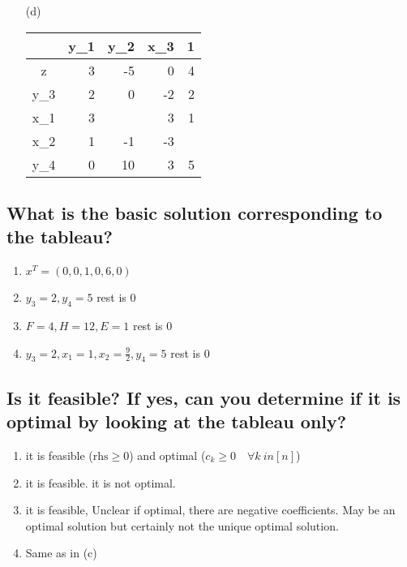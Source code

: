\documentclass[12pt, a4]{article}
\begin{document}
\begin{minipage}[h]{.5\textwidth}
	\begin{enumerate}
		\item[(d)] {\begin{tabular}{C|RRR|R}
				& y_1 & y_2 & x_3 & 1 \\
				\hline
				z& 3 & -5 & 0 & 4 \\
				\hline
				y_3 & 2 & 0 & -2 & 2 \\
				x_1 & 3 &  & 3 & 1 \\
				x_2 & 1 & -1 & -3 &  \\
				y_4 & 0 & 10 & 3 & 5
		\end{tabular}}
	\end{enumerate}
\end{minipage}

\subsection{What is the basic solution corresponding to the tableau?}
\begin{enumerate}[label=(\alph*)]
	\item $x^T = (0,0,1,0,6,0)$
	\item $y_3 = 2, y_4 = 5$ rest is $0$
	\item $F = 4, H = 12, E = 1$ rest is $0$
	\item $y_3 =2, x_1 = 1, x_2 = \frac{9}{2}, y_4 = 5$ rest is $0$
\end{enumerate}
\subsection{Is it feasible? If yes, can you determine if it is optimal by looking at the tableau only?}
\begin{enumerate}[label=(\alph*)]
	\item it is feasible ($\text{rhs} \geq 0$) and optimal ($c_k \geq 0 \quad\forall k \ in [n]$)
	\item it is feasible. it is not optimal. 
	\item it is feasible, Unclear if optimal, there are negative coefficients. May be an optimal solution but certainly not the unique optimal solution.
	\item Same as in (c)
\end{enumerate}
	
\end{document}
